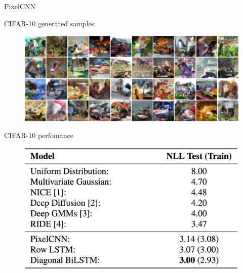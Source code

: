 \begin{frame}{PixelCNN}
	\begin{block}{CIFAR-10 generated samples}
		\begin{figure}
			\centering
	  		\includegraphics[width=0.7\linewidth]{figs/pixelcnn_results}
		\end{figure}
	\end{block}
	\vspace{-0.2cm}
	\begin{block}{CIFAR-10 perfomance}
		\begin{figure}
			\centering
	  		\includegraphics[width=0.45\linewidth]{figs/pixelcnn_results2}
		\end{figure}
	\end{block}
\end{frame}
